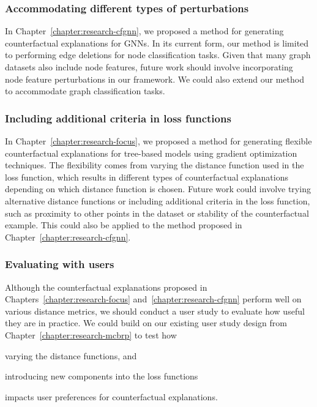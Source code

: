 \subsubsection{Accommodating different types of perturbations}
In Chapter~\ref{chapter:research-cfgnn}, we proposed a method for generating counterfactual explanations for GNNs.  
In its current form, our method is limited to performing edge deletions for node classification tasks. 
Given that many graph datasets also include node features, future work should involve incorporating node feature perturbations in our framework. 
We could also extend our method to accommodate graph classification tasks. 



\subsubsection{Including additional criteria in loss functions}
In Chapter~\ref{chapter:research-focus}, we proposed a method for generating flexible counterfactual explanations for tree-based models using gradient optimization techniques. 
The flexibility comes from varying the distance function used in the loss function, which results in different types of counterfactual explanations depending on which distance function is chosen. 
Future work could involve trying alternative distance functions or including additional criteria in the loss function, such as proximity to other points in the dataset or stability of the counterfactual example. 
This could also be applied to the method proposed in Chapter~\ref{chapter:research-cfgnn}. 




\subsubsection{Evaluating with users}
Although the counterfactual explanations proposed in Chapters~\ref{chapter:research-focus} and~\ref{chapter:research-cfgnn} perform well on various distance metrics, we should conduct a user study to evaluate how useful they are in practice. 
We could build on our existing user study design from Chapter~\ref{chapter:research-mcbrp} to test how
\begin{inparaenum}[(i)]
	\item varying the distance functions, and 
	\item introducing new components into the loss functions
\end{inparaenum}
impacts user preferences for counterfactual explanations. 


